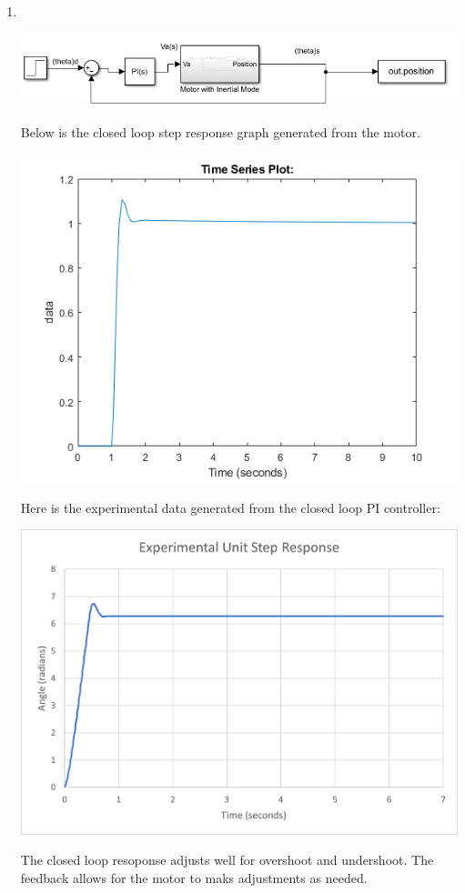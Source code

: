 \documentclass{article}
\begin{document}
\begin{enumerate}
        \item \ \\
        \begin{center}
            \includegraphics[width=0.8\linewidth]{closedLoop.PNG}
        \end{center}
        Below is the closed loop step response graph generated from the motor.
        \begin{center}
            \includegraphics[width=0.6\linewidth]{closedLoopResponse.png}
        \end{center}
        Here is the experimental data generated from the closed loop PI controller:
        \begin{center}
            \includegraphics[width=0.6\linewidth]{experimentalClosedLoopResponse.png}
        \end{center}
        The closed loop resoponse adjusts well for overshoot and undershoot. The feedback allows for the motor to maks adjustments as needed. 


\end{enumerate}
\end{document}
